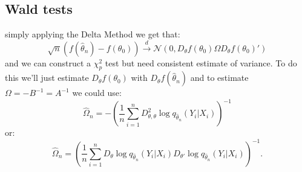 \documentclass{tufte-book}
\theoremstyle{mytheoremstyle}
\theoremstyle{mylemstyle}
\theoremstyle{mydefstyle}
\begin{document}
\subsection{Wald tests}
 simply applying the Delta Method we get that:
	\[\sqrt{n}(f(\hat{\theta}_n) - f(\theta_0)) \overset{d}{\rightarrow} \mathcal{N}(0, D_\theta f(\theta_0) \Omega D_\theta f(\theta_0)')\]
and we can construct a \(\chi_p^2\) test but need consistent estimate of variance. To do this we'll just estimate \(D_\theta f(\theta_0)\) with \(D_\theta f(\hat{\theta}_n)\) and to estimate \(\Omega = -B^{-1} = A^{-1}\) we could use:
	\[\hat{\Omega}_n = -\left(\frac{1}{n} \sum_{i=1}^n D_{\theta, \theta}^2 \log q_{\hat{\theta}_n} (Y_i| X_i) \right)^{-1}\]
or:
	\[\hat{\Omega}_n = \left(\frac{1}{n} \sum_{i=1}^n D_\theta \log q_{\hat{\theta}_n} (Y_i| X_i) D_{\theta'} \log q_{\hat{\theta}_n}(Y_i|X_i) \right)^{-1} \text{.}\]
\end{document}
